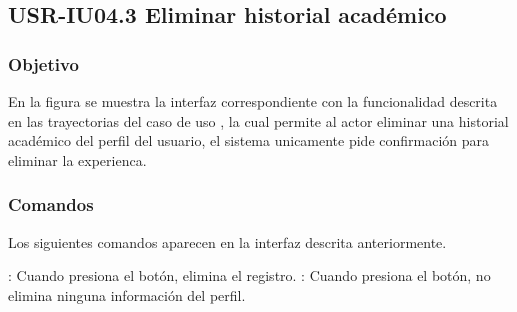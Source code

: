 \clearpage
\subsection{USR-IU04.3 Eliminar historial académico}

\subsubsection{Objetivo}
En la figura  se muestra la interfaz correspondiente con la funcionalidad descrita en las
trayectorias del caso de uso  , la cual permite al actor eliminar una historial académico del perfil del usuario, el sistema unicamente pide confirmación para eliminar la experienca.

\subsubsection{Comandos}
Los siguientes comandos aparecen en la interfaz descrita anteriormente.

\Titem {} : Cuando presiona el botón, elimina el registro.
\Titem {} : Cuando presiona el botón, no elimina ninguna información del perfil.%



\clearpage
